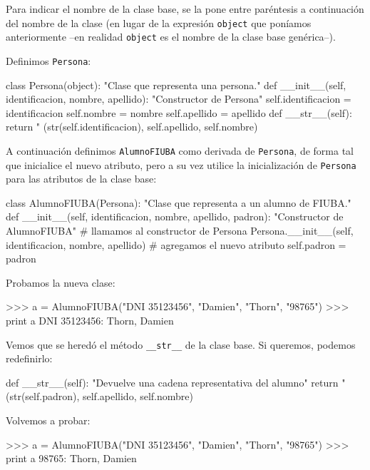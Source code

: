Para indicar el nombre de la clase base, se la pone entre paréntesis a
continuación del nombre de la clase (en lugar de la expresión
\lstinline!object! que poníamos anteriormente --en realidad \lstinline!object!
es el nombre de la clase base genérica--).

Definimos \lstinline!Persona!:
\begin{codigo-python-sn}
class Persona(object):
    "Clase que representa una persona."
    def __init__(self, identificacion, nombre, apellido):
        "Constructor de Persona"
        self.identificacion = identificacion
        self.nombre = nombre
        self.apellido = apellido
    def __str__(self):
        return "%
            (str(self.identificacion), self.apellido, self.nombre)
\end{codigo-python-sn}

A continuación definimos \lstinline!AlumnoFIUBA! como derivada de
\lstinline!Persona!, de forma tal que inicialice el nuevo atributo, pero a su
vez utilice la inicialización de \lstinline!Persona! para las atributos de la
clase base:

\begin{codigo-python-sn}
class AlumnoFIUBA(Persona):
    "Clase que representa a un alumno de FIUBA."
    def __init__(self, identificacion, nombre, apellido, padron):
        "Constructor de AlumnoFIUBA"
        # llamamos al constructor de Persona
        Persona.__init__(self, identificacion, nombre, apellido)
        # agregamos el nuevo atributo
        self.padron = padron
\end{codigo-python-sn}

Probamos la nueva clase:

\begin{codigo-python-sn}
>>> a = AlumnoFIUBA("DNI 35123456", "Damien", "Thorn", "98765")
>>> print a
DNI 35123456: Thorn, Damien
\end{codigo-python-sn}

Vemos que se heredó el método \lstinline+__str__+ de la clase base. Si
queremos, podemos redefinirlo:

\begin{codigo-python-sn}
    def __str__(self):
        "Devuelve una cadena representativa del alumno"
        return "%
            (str(self.padron), self.apellido, self.nombre)
\end{codigo-python-sn}

Volvemos a probar:

\begin{codigo-python-sn}
>>> a = AlumnoFIUBA("DNI 35123456", "Damien", "Thorn", "98765")
>>> print a
98765: Thorn, Damien
\end{codigo-python-sn}

